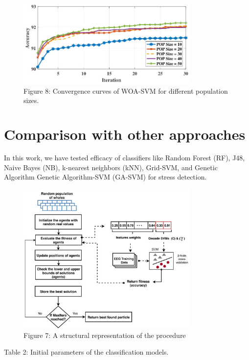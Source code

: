 \documentclass{article}
\begin{document}
\begin{figure}[htbp]
\centering
\includegraphics[width=0.8\textwidth]{images/43d14d83c76062f457f9dc0086d5e9adf103e161a24a04f5af03173f16073b4b.jpg}
\caption{Figure 8: Convergence curves of WOA-SVM for different population sizes.}
\end{figure}


\section{Comparison with other approaches}


In this work, we have tested efficacy of classifiers like Random Forest (RF), J48, Naive Bayes (NB), k-nearest neighbors (kNN), Grid-SVM, and Genetic Algorithm Genetic Algorithm-SVM (GA-SVM) for stress detection.


\begin{figure}[htbp]
\centering
\includegraphics[width=0.8\textwidth]{images/803c589ba4f13b47d3842e8dcc603380d2dd4363175f03a417f4b721e13f7b75.jpg}
\caption{Figure 7: A structural representation of the procedure}
\end{figure}


Table 2: Initial parameters of the classification models.
\end{document}
